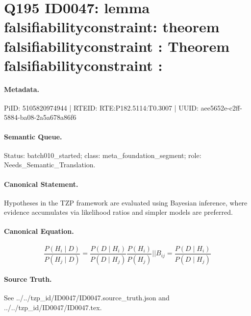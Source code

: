\section*{Q195 ID0047: lemma falsifiabilityconstraint: theorem falsifiabilityconstraint : Theorem falsifiabilityconstraint :}
\paragraph{Metadata.}
PiID: 5105820974944 | RTEID: RTE:P182.5114:T0.3007 | UUID: aee5652e-c2ff-5884-ba08-2a5a678a86f6

\paragraph{Semantic Queue.}
Status: batch010\_started; class: meta\_foundation\_segment; role: Needs\_Semantic\_Translation.

\paragraph{Canonical Statement.}
Hypotheses in the TZP framework are evaluated using Bayesian inference, where evidence accumulates via likelihood ratios and simpler models are preferred.

\paragraph{Canonical Equation.}
\[
\frac{P(H_{i}\mid D)}{P(H_{j}\mid D)} = \frac{P(D\mid H_{i})}{P(D\mid H_{j})} \frac{P(H_{i})}{P(H_{j})} || B_{ij} = \frac{P(D\mid H_{i})}{P(D\mid H_{j})}
\]

\paragraph{Source Truth.}
See ../../tzp\_id/ID0047/ID0047.source\_truth.json and ../../tzp\_id/ID0047/ID0047.tex.
